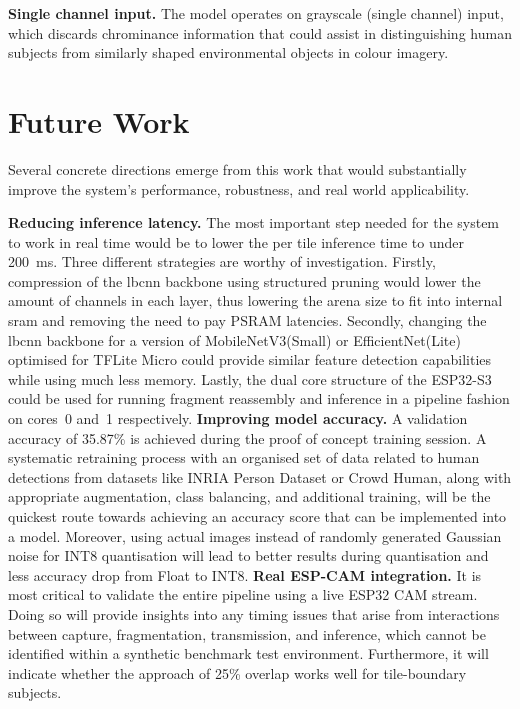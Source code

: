 \textbf{Single channel input.} The model operates on grayscale (single channel) input,
which discards chrominance information that could assist in distinguishing human subjects
from similarly shaped environmental objects in colour imagery.
 
\section{Future Work}
 
Several concrete directions emerge from this work that would substantially improve the
system's performance, robustness, and real world applicability.
 
\textbf{Reducing inference latency.} The most important step needed for the system to work in real time would be to lower the per tile inference time to under 200~ms. Three different strategies are worthy of investigation. Firstly, compression of the \gls{lbcnn} backbone using structured pruning would lower the amount of channels in each layer, thus lowering the arena size to fit into internal \gls{sram}
and removing the need to pay PSRAM latencies. Secondly, changing the \gls{lbcnn} backbone for a version of MobileNetV3(Small) or EfficientNet(Lite) optimised for TFLite Micro could provide similar feature detection capabilities while using much less memory. Lastly, the dual core structure of the ESP32-S3 could be used for running fragment reassembly and inference in a
pipeline fashion on cores~0 and~1 respectively.
\textbf{Improving model accuracy.} A validation accuracy of 35.87\% is achieved during the proof of concept training session. A systematic retraining process with an organised set of data related to human detections from datasets like INRIA Person Dataset or Crowd Human, along with appropriate augmentation, class balancing, and additional training, will be the quickest route towards achieving an accuracy score that can be implemented into a model. Moreover, using actual images instead of randomly generated Gaussian noise for INT8 quantisation will lead to better results during quantisation and less accuracy drop from Float to INT8.
\textbf{Real ESP-CAM integration.} It is most critical to validate the entire pipeline using a live ESP32 CAM stream. Doing so will provide insights into any timing issues that arise from interactions between capture, fragmentation, transmission, and inference, which cannot be identified within a synthetic benchmark test environment. Furthermore, it will indicate whether the approach of 25\%
overlap works well for tile-boundary subjects.
 
